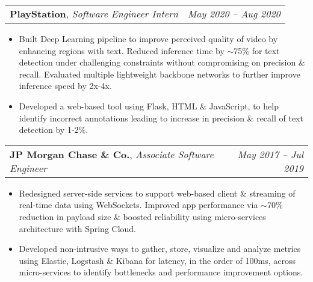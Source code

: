 \documentclass[letterpaper,10pt]{article}
\makeatletter
\newcommand{\resumeItem}[2]{
	\item\normalsize{
		\textbf{#1}{: #2}
	}\vspace{-2pt}
}
\newcommand{\resumeSubheading}[4]{
	\vspace{2pt}\item[]
	\begin{tabular*}{\textwidth}[t]{l@{\extracolsep{\fill}}r}
		\textbf{#1}, \textit{\small#3} \textit{\small#2} & \textit{\small #4} \\
	\end{tabular*}\vspace{-4pt}
}
\newcommand{\resumeSubHeadingListStart}{\begin{itemize}[leftmargin=\hoffset]}
\newcommand{\resumeSubHeadingListEnd}{\end{itemize}}
\makeatother
\begin{document}
	
	\resumeSubheading
	{PlayStation}{}
	{Software Engineer Intern}{May 2020 -- Aug 2020}
	\resumeSubHeadingListStart
	\item{Built Deep Learning pipeline to improve perceived quality of video by enhancing regions with text. Reduced inference time by $\sim$75\% for text detection under challenging constraints without compromising on precision \& recall. Evaluated multiple lightweight backbone networks to further improve inference speed by 2x-4x.}
	\item{Developed a web-based tool using Flask, HTML \& JavaScript, to help identify incorrect annotations leading to increase in precision \& recall of text detection by 1-2\%.}
	\vspace{-2mm}
	\resumeSubHeadingListEnd
	
	\resumeSubheading
	{JP Morgan Chase \& Co.}{}
	{Associate Software Engineer}{May 2017 -- Jul 2019}
	\resumeSubHeadingListStart
	\item{Redesigned server-side services to support web-based client \& streaming of real-time data using WebSockets. Improved app performance via $\sim$70\%  reduction in payload size \& boosted reliability using micro-services architecture with Spring Cloud.}
	\item{Developed non-intrusive ways to gather, store, visualize and analyze metrics using Elastic, Logstash \& Kibana for latency, in the order of 100ms, across micro-services to identify bottlenecks and performance improvement options.}
	\vspace{-2mm}
	\resumeSubHeadingListEnd
	
\end{document}
